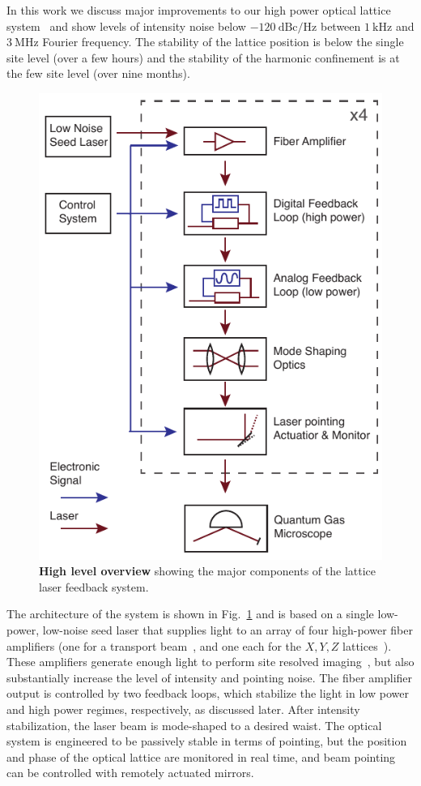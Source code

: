 \documentclass[twocolumn,aps,pra,showpacs,preprintnumbers,bibnotes]{revtex4-1}
\newcommand\unit[2]{\ensuremath{#1~\mathrm{{#2}}}}
\begin{document}
In this work we discuss major improvements to our high power optical lattice system~\cite{Blatt2015} and show levels of intensity noise below \unit{-120}{dBc/Hz} between \unit{1}{kHz} and \unit{3}{MHz} Fourier frequency.
The stability of the lattice position is below the single site level (over a few hours) and the stability of the harmonic confinement is at the few site level (over nine months).

\begin{figure}[t]
  \begin{center}
    \includegraphics[width=0.85\columnwidth]{Figure1.pdf}
    \caption{\textbf{High level overview} showing the major components of the lattice laser feedback system.}\label{fig:high_level}
  \end{center}
\end{figure}

The architecture of the system is shown in Fig.~\ref{fig:high_level} and is based on a single low-power, low-noise seed laser that supplies light to an array of four high-power fiber amplifiers (one for a transport beam~\cite{Huber2014}, and one each for the $X,Y,Z$ lattices~\cite{Blatt2015,Parsons2016}).
These amplifiers generate enough light to perform site resolved imaging~\cite{Parsons2015}, but also substantially increase the level of intensity and pointing noise.
The fiber amplifier output is controlled by two feedback loops, which stabilize the light in low power and high power regimes, respectively, as discussed later.
After intensity stabilization, the laser beam is mode-shaped to a desired waist.
The optical system is engineered to be passively stable in terms of pointing, but the position and phase of the optical lattice are monitored in real time, and beam pointing can be controlled with remotely actuated mirrors.
\end{document}
